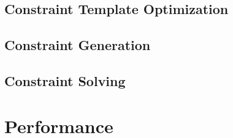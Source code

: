 \subsection{Constraint Template Optimization}
\label{sec:constr-templ-optim}
\subsection{Constraint Generation}
\label{sec:constr-gener}
\subsection{Constraint Solving}
\label{sec:constraint-solving}
\section{Performance}
\label{sec:performance}


